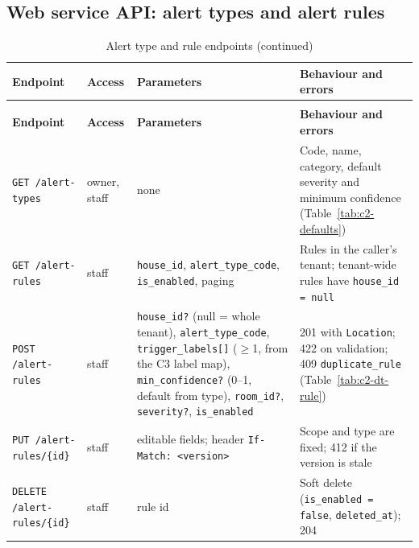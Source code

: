\subsection{Web service API: alert types and alert rules}
\begin{longtable}{L{3.4cm}L{1.4cm}L{5.0cm}L{5.0cm}}
\caption{Alert type and rule endpoints}\label{tab:c2-post-rule}\\
\toprule
\textbf{Endpoint} & \textbf{Access} & \textbf{Parameters} & \textbf{Behaviour and errors} \\
\midrule
\endfirsthead
\caption[]{Alert type and rule endpoints (continued)}\\
\toprule
\textbf{Endpoint} & \textbf{Access} & \textbf{Parameters} & \textbf{Behaviour and errors} \\
\midrule
\endhead
\texttt{GET /alert-types} & owner, staff & none & Code, name, category, default severity and minimum confidence (Table~\ref{tab:c2-defaults}) \\
\texttt{GET /alert-rules} & staff & \texttt{house\_id}, \texttt{alert\_type\_code}, \texttt{is\_enabled}, paging & Rules in the caller's tenant; tenant-wide rules have \texttt{house\_id = null} \\
\texttt{POST /alert-rules} & staff & \texttt{house\_id?} (null = whole tenant), \texttt{alert\_type\_code}, \texttt{trigger\_labels[]} ($\ge$1, from the C3 label map), \texttt{min\_confidence?} (0--1, default from type), \texttt{room\_id?}, \texttt{severity?}, \texttt{is\_enabled} & 201 with \texttt{Location}; 422 on validation; 409 \texttt{duplicate\_rule} (Table~\ref{tab:c2-dt-rule}) \\
\texttt{PUT /alert-rules/\{id\}} & staff & editable fields; header \texttt{If-Match: <version>} & Scope and type are fixed; 412 if the version is stale \\
\texttt{DELETE /alert-rules/\{id\}} & staff & rule id & Soft delete (\texttt{is\_enabled = false}, \texttt{deleted\_at}); 204 \\
\bottomrule
\end{longtable}

